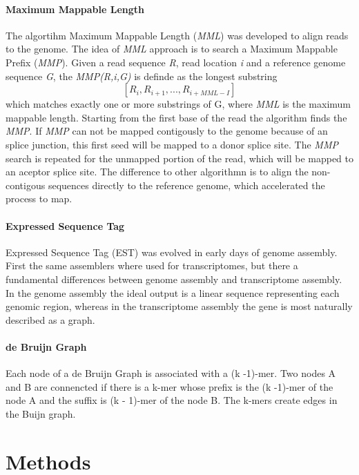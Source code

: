 \documentclass[12pt, a4paper]{report}
\begin{document}
\subsubsection{Maximum Mappable Length}\label{MML}
The algortihm Maximum Mappable Length (\textit{MML}) was developed to align reads to the genome. 
The idea of \textit{MML} approach is to search a Maximum Mappable Prefix (\textit{MMP}). Given a read sequence \textit{R}, read location \textit{i} and a reference genome sequence \textit{G}, the \textit{MMP(R,i,G)} is definde as the longest substring  
\[
		 [R_{i} , R_{i+1} , ... , R_{i+MML-I} ]
\]
which matches exactly one or more substrings of G, where \textit{MML} is the maximum mappable length. 
Starting from the first base of the read the algorithm finds the \textit{MMP}. If \textit{MMP} can not be mapped contigously to the genome because of an splice junction, this first seed will be mapped to a donor splice site. The \textit{MMP} search is repeated for the unmapped portion of the read, which will be mapped to an aceptor splice site.
The difference to other algorithmn is to align the non-contigous sequences directly to the reference genome, which accelerated the process to map. \cite{Dobin2013}
\subsubsection{Expressed Sequence Tag}\label{EST}
Expressed Sequence Tag (EST) was evolved in early days of genome assembly. First the same assemblers where used for transcriptomes, but there a fundamental differences between genome assembly and transcriptome assembly. In the genome assembly the ideal output is a linear sequence representing each genomic region, whereas in the transcriptome assembly the gene is most naturally described as a graph. \cite{Korpelainen2014}

\subsubsection{de Bruijn Graph}\label{Graph}
Each node of a de Bruijn Graph is associated with a (k -1)-mer. Two nodes A and B are connencted if there is a k-mer whose prefix is the (k -1)-mer of the node A and the suffix is (k - 1)-mer of the node B. The k-mers create edges in the Buijn graph. \cite{Korpelainen2014}

\newpage
\setcounter{chapter}{2}\setcounter{section}{0}
\chapter*{Methods}
\end{document}
